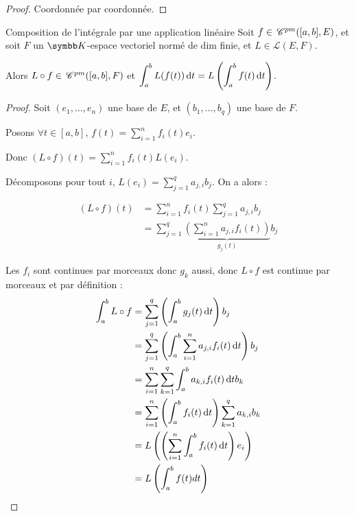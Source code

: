 \begin{proof}
    Coordonnée par coordonnée.
\end{proof}


\begin{theoreme}{Composition de l'intégrale par une application linéaire}{}
    Soit $f \in \,\mathscr C^{pm}([a, b], E)$, et soit $F$ un $\K$-espace vectoriel normé de dim finie, et 
    $L \in \mathscr L(E, F)$.

    Alors $L \circ f \in \,\mathscr C^{pm}([a, b], F)$ et $\displaystyle \int_a^b L(f(t)) \,\mathrm{d}t = L\left( \int_a^b f(t) \,\mathrm{d}t \right)$.
\end{theoreme}


\begin{proof}
    Soit $(e_1, \ldots, e_n)$ une base de $E$, et $(b_1, \ldots, b_q)$ une base de $F$.

    Posons $\displaystyle \forall t \in [a, b], \, f(t) = \sum_{i=1}^n f_i(t)e_i$.

    Donc $\displaystyle (L \circ f)(t) = \sum_{i=1}^n f_i(t)L(e_i)$.

    Décomposons pour tout $i$, $\displaystyle L(e_i) = \sum_{j=1}^q a_{j, i} b_j$.
    On a alors :

    \begin{align*}
        (L \circ f) (t) & = \sum_{i=1}^n f_i(t) \sum_{j=1}^q a_{j, i} b_j \\
        & = \sum_{j=1}^q \underbrace{\left( \sum_{i=1}^n a_{j, i} f_i(t) \right)}_{g_j(t)} b_j
    \end{align*}

    Les $f_i$ sont continues par morceaux donc $g_k$ aussi, donc $L \circ f$ est continue par morceaux et par définition : 
    {\allowdisplaybreaks
    \begin{align*}
        \int_a^b L \circ f & = \sum_{j=1}^q \left( \int_a^b g_j(t) \,\mathrm{d}t \right) b_j \\
        & = \sum_{j=1}^q \left( \int_a^b \sum_{i=1}^n a_{j, i} f_i(t) \,\mathrm{d}t \right) b_j \\
        & = \sum_{i = 1}^n \sum_{k = 1 }^{q } \int_{a }^{b } a_{k, i} f_i(t) \,\mathrm{d}t b_k \\
        & = \sum_{i=1}^n \left( \int_a^b f_i(t) \,\mathrm{d}t \right) \sum_{k=1}^q a_{k, i} b_k \\
        & = L \left(\left(\sum_{i = 1 }^{n } \int_{a }^{b } f_i(t) \,\mathrm{d}t\right) e_i\right) \\
        & = L \left( \int_a^b f(t) dt \right)
    \end{align*}
    }
\end{proof}

